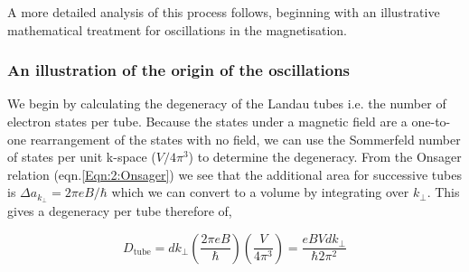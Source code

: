 A more detailed analysis of this process follows, beginning with an illustrative mathematical treatment for oscillations in the magnetisation.

\subsubsection{An illustration of the origin of the oscillations}

We begin by calculating the degeneracy of the Landau tubes i.e. the number of electron states per tube. Because the states under a magnetic field are a one-to-one rearrangement of the states with no field, we can use the Sommerfeld number of states per unit k-space ($V/4\pi^3$) to determine the degeneracy. From the Onsager relation (eqn.\ref{Eqn:2:Onsager}) we see that the additional area for successive tubes is $\Delta a_{k_{\perp}}  = 2\pi e B/\hbar$ which we can convert to a volume by integrating over $k_{\perp}$. This gives a degeneracy per tube therefore of,

\begin{equation}
D_{\textrm{tube}} = d k_{\perp}\left(\frac{2\pi e B}{\hbar}\right)\left(\frac{V}{4 \pi^3}\right) = \frac{eBVdk_{\perp}}{\hbar 2\pi^2}
\end{equation}

